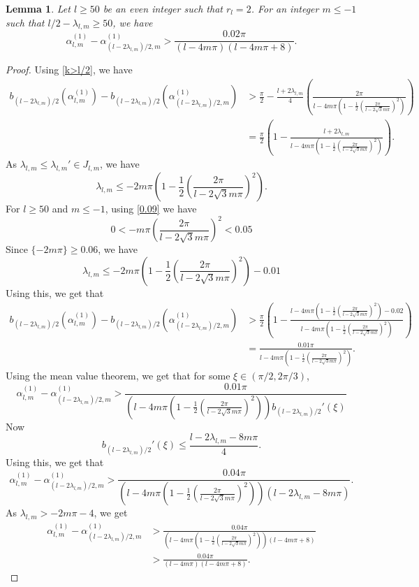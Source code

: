 \documentclass[12pt,reqno]{amsart}
\newtheorem{lem}{Lemma}
\begin{document}
\begin{lem}\label{lk>l/2}
Let $l\ge50$ be an even integer such that $r_l=2$. For an integer $m\le-1$ such that $l/2-\lambda_{l,m}\ge 50$, we have
$$
\alpha_{l,m}^{(1)}-\alpha_{(l-2\lambda_{l,m})/2,m}^{(1)}>\frac{0.02\pi}{(l-4m\pi)(l-4m\pi+8)}.
$$
\end{lem}
\begin{proof}
Using \eqref{k>l/2}, we have
\begin{align*}
b_{(l-2\lambda_{l,m})/2}(\alpha_{l,m}^{(1)})-b_{(l-2\lambda_{l,m})/2}(\alpha_{(l-2\lambda_{l,m})/2,m}^{(1)})&>\frac{\pi}{2}-
\frac{l+2\lambda_{l,m}}{4}\left(\frac{2\pi}{l-4m\pi\left(1-\frac{1}{2}\left(\frac{2\pi}{l-2\sqrt3m\pi}\right)^2\right)}\right)\\
&=\frac{\pi}{2}\left(1-\frac{l+2\lambda_{l,m}}{l-4m\pi\left(1-\frac{1}{2}\left(\frac{2\pi}{l-2\sqrt3m\pi}\right)^2\right)}\right).
\end{align*}
As $\lambda_{l,m}\le \lambda_{l,m}'\in J_{l,m}$, we have
\begin{equation}\label{0.005}
\lambda_{l,m}\le -2m\pi\left(1-\frac{1}{2}\left(\frac{2\pi}{l-2\sqrt3m\pi}\right)^2\right).
\end{equation}
For $l\ge 50$ and $m\le-1$, using \eqref{0.09} we have
$$
0<-m\pi\left(\frac{2\pi}{l-2\sqrt3m\pi}\right)^2<0.05
$$
Since $ \{-2m\pi\}\ge 0.06$, we have
$$
\lambda_{l,m}\le -2m\pi\left(1-\frac{1}{2}\left(\frac{2\pi}{l-2\sqrt3m\pi}\right)^2\right)-0.01
$$
Using this, we get that
\begin{align*}
b_{(l-2\lambda_{l,m})/2}(\alpha_{l,m}^{(1)})-b_{(l-2\lambda_{l,m})/2}(\alpha_{(l-2\lambda_{l,m})/2,m}^{(1)})&>\frac{\pi}{2}\left(1-\frac{l-4m\pi\left(1-\frac{1}{2}\left(\frac{2\pi}{l-2\sqrt3m\pi}\right)^2\right)-0.02}{l-4m\pi\left(1-\frac{1}{2}\left(\frac{2\pi}{l-2\sqrt3m\pi}\right)^2\right)}\right)\\
&=\frac{0.01\pi}{l-4m\pi\left(1-\frac{1}{2}\left(\frac{2\pi}{l-2\sqrt3m\pi}\right)^2\right)}.
\end{align*}
Using the mean value theorem, we get that for some $\xi\in (\pi/2,2\pi/3)$,
$$
\alpha_{l,m}^{(1)}-\alpha_{(l-2\lambda_{l,m})/2,m}^{(1)}>\frac{0.01\pi}{\left(l-4m\pi\left(1-\frac{1}{2}\left(\frac{2\pi}{l-2\sqrt3m\pi}\right)^2\right)\right)b_{(l-2\lambda_{l,m})/2}'(\xi)}
$$
Now 
$$
b_{(l-2\lambda_{l,m})/2}'(\xi)\le \frac{l-2\lambda_{l,m}-8m\pi}{4}.
$$
Using this, we get that
$$
\alpha_{l,m}^{(1)}-\alpha_{(l-2\lambda_{l,m})/2,m}^{(1)}>\frac{0.04\pi}{\left(l-4m\pi\left(1-\frac{1}{2}\left(\frac{2\pi}{l-2\sqrt3m\pi}\right)^2\right)\right)(l-2\lambda_{l,m}-8m\pi)}.
$$
As $\lambda_{l,m}>-2m\pi-4$, we get 
\begin{align*}
\alpha_{l,m}^{(1)}-\alpha_{(l-2\lambda_{l,m})/2,m}^{(1)}&>\frac{0.04\pi}{\left(l-4m\pi\left(1-\frac{1}{2}\left(\frac{2\pi}{l-2\sqrt3m\pi}\right)^2\right)\right)(l-4m\pi+8)}\\
&>\frac{0.04\pi}{(l-4m\pi)(l-4m\pi+8)}.
\end{align*}
\end{proof}
\end{document}
